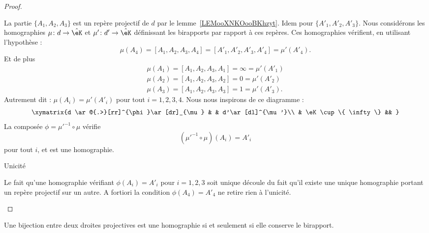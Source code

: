 \begin{proof}
\begin{subproof}
            La partie \( \{ A_1,A_2,A_3 \}\) est un repère projectif de \( d\) par le lemme~\ref{LEMooXNKOooBKhzyt}. Idem pour \( \{ A'_1,A'_2,A'_3 \}\). Nous considérons les homographies \( \mu\colon d\to  \hat \eK\) et \( \mu'\colon d'\to \hat\eK\) définissant les birapports par rapport à ces repères. Ces homographies vérifient, en utilisant l'hypothèse :
            \begin{equation}
                \mu(A_4)=[A_1,A_2,A_3,A_4]=[A'_1,A'_2,A'_3,A'_4]=\mu'(A'_4).
            \end{equation}
            Et de plus
            \begin{subequations}
                \begin{align}
                    \mu(A_1)=[A_1,A_2,A_3,A_1]=\infty=\mu'(A'_1)\\
                    \mu(A_2)=[A_1,A_2,A_3,A_2]=0=\mu'(A'_2)\\
                    \mu(A_3)=[A_1,A_2,A_3,A_3]=1=\mu'(A'_3).
                \end{align}
            \end{subequations}
            Autrement dit : \( \mu(A_i)=\mu'(A'_i)\) pour tout \( i=1,2,3,4\). Nous nous inspirons de ce diagramme :
            \begin{equation}
            \xymatrix{%
                d \ar@{.>}[rr]^{\phi}\ar[dr]_{\mu}  &    &   d'\ar[dl]^{\mu'}\\
                &  \eK\cup\{ \infty \} &&
               }
            \end{equation}
            La composée \( \phi=\mu'^{-1}\circ\mu\) vérifie
            \begin{equation}
                (\mu'^{-1}\circ\mu)(A_i)=A'_i
            \end{equation}
            pour tout \( i\), et est une homographie.

        \item[Unicité]

            Le fait qu'une homographie vérifiant \( \phi(A_i)=A'_i\) pour \( i=1,2,3\) soit unique découle du fait qu'il existe une unique homographie portant un repère projectif sur un autre. A fortiori la condition \( \phi(A_4)=A'_4\) ne retire rien à l'unicité.

    \end{subproof}
\end{proof}

\begin{theorem}
    Une bijection entre deux droites projectives est une homographie si et seulement si elle conserve le birapport.
\end{theorem}

